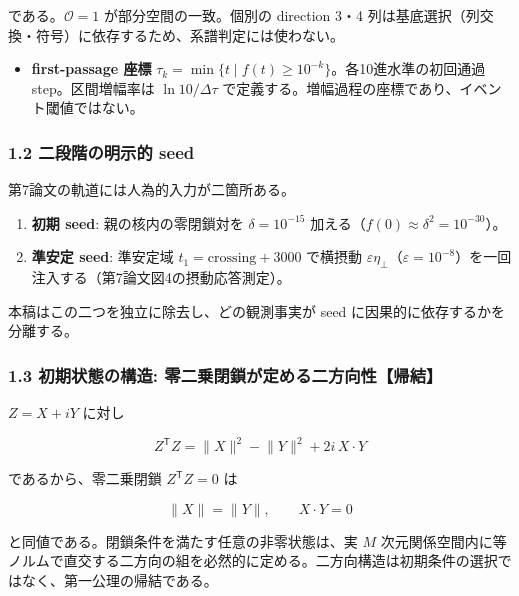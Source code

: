 \documentclass[
  a4paper,
]{ltjsarticle}
\providecommand{\tightlist}{%
  \setlength{\itemsep}{0pt}\setlength{\parskip}{0pt}}
\begin{document}
である。\(\mathcal O=1\) が部分空間の一致。個別の direction 3・4
列は基底選択（列交換・符号）に依存するため、系譜判定には使わない。

\begin{itemize}
\tightlist
\item
  \textbf{first-passage 座標}
  \(\tau_k=\min\{t\mid f(t)\ge 10^{-k}\}\)。各10進水準の初回通過
  step。区間増幅率は \(\ln 10/\Delta\tau\)
  で定義する。増幅過程の座標であり、イベント閾値ではない。
\end{itemize}

\subsubsection{1.2 二段階の明示的
seed}\label{ux4e8cux6bb5ux968eux306eux660eux793aux7684-seed}

第7論文の軌道には人為的入力が二箇所ある。

\begin{enumerate}
\def\labelenumi{\arabic{enumi}.}
\tightlist
\item
  \textbf{初期 seed}: 親の核内の零閉鎖対を \(\delta=10^{-15}\)
  加える（\(f(0)\approx\delta^2=10^{-30}\)）。
\item
  \textbf{準安定 seed}: 準安定域 \(t_1=\mathrm{crossing}+3000\) で横摂動
  \(\varepsilon\eta_\perp\)（\(\varepsilon=10^{-8}\)）を一回注入する（第7論文図4の摂動応答測定）。
\end{enumerate}

本稿はこの二つを独立に除去し、どの観測事実が seed
に因果的に依存するかを分離する。

\subsubsection{1.3 初期状態の構造:
零二乗閉鎖が定める二方向性【帰結】}\label{ux521dux671fux72b6ux614bux306eux69cbux9020-ux96f6ux4e8cux4e57ux9589ux9396ux304cux5b9aux3081ux308bux4e8cux65b9ux5411ux6027ux5e30ux7d50}

\(Z=X+iY\) に対し

\[Z^{\mathsf T}Z=\lVert X\rVert^2-\lVert Y\rVert^2+2i\,X\cdot Y\]

であるから、零二乗閉鎖 \(Z^{\mathsf T}Z=0\) は

\[\lVert X\rVert=\lVert Y\rVert,\qquad X\cdot Y=0\]

と同値である。閉鎖条件を満たす任意の非零状態は、実 \(M\)
次元関係空間内に等ノルムで直交する二方向の組を必然的に定める。二方向構造は初期条件の選択ではなく、第一公理の帰結である。
\end{document}
